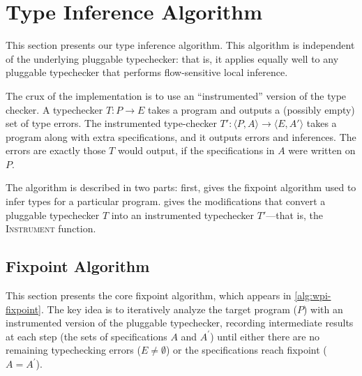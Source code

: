 \section{Type Inference Algorithm}
\label{sec:algorithm}

This section presents our type inference algorithm. This algorithm is
independent of the underlying pluggable typechecker: that is,
it applies equally well to any pluggable typechecker that performs flow-sensitive
local inference.


The crux of the implementation is to use an
``instrumented'' version of the type checker.  A typechecker
$T : P \rightarrow E$
takes a program and outputs a (possibly empty) set of
type errors.  The instrumented type-checker
$T' : \langle P, A \rangle \rightarrow \langle E, A' \rangle$
takes a program along with extra specifications, and it outputs errors and
inferences.  The errors are exactly those $T$ would output, if the
specifications in $A$ were written on $P$.

The algorithm is described in two parts: first,
 gives the fixpoint
algorithm used to infer types for a particular program.
 gives the modifications that convert a pluggable
typechecker $T$ into an instrumented typechecker $T'$---that is,
the \textsc{Instrument} function.


\subsection{Fixpoint Algorithm}
\label{sec:core-algorithm}



This section presents the core fixpoint algorithm, which appears
in \cref{alg:wpi-fixpoint}. The key idea is to iteratively analyze
the target program ($P$) with an instrumented version of the
pluggable typechecker, recording intermediate results at each
step (the sets of specifications $A$ and $A^{\prime}$) until
either there are no remaining typechecking errors (\ie $E \neq \emptyset$)
or the
specifications reach fixpoint (\ie $A = A^{\prime}$).

